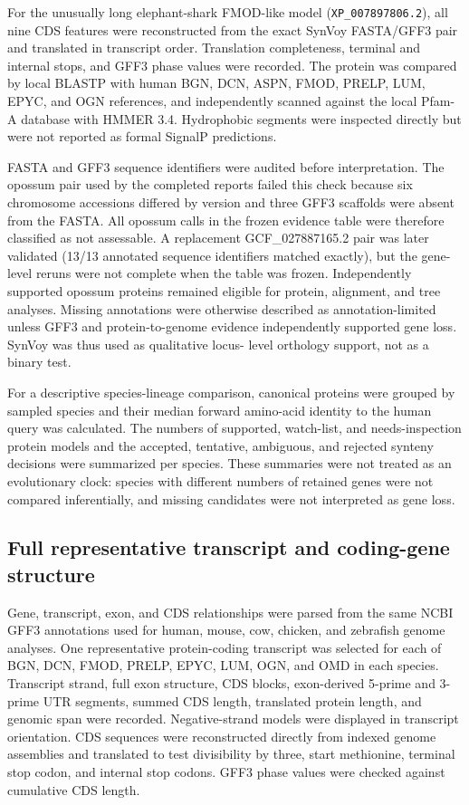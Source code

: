 For the unusually long elephant-shark FMOD-like model
(\texttt{XP\_007897806.2}), all nine CDS features were reconstructed from the
exact SynVoy FASTA/GFF3 pair and translated in transcript order. Translation
completeness, terminal and internal stops, and GFF3 phase values were recorded.
The protein was compared by local BLASTP with human BGN, DCN, ASPN, FMOD,
PRELP, LUM, EPYC, and OGN references, and independently scanned against the
local Pfam-A database with HMMER 3.4. Hydrophobic segments were inspected
directly but were not reported as formal SignalP predictions.

FASTA and GFF3 sequence identifiers were audited before interpretation. The
opossum pair used by the completed reports failed this check because six
chromosome accessions differed by version and three GFF3 scaffolds were absent
from the FASTA. All opossum calls in the frozen evidence table were therefore
classified as not assessable. A replacement GCF\_027887165.2 pair was later
validated (13/13 annotated sequence identifiers matched exactly), but the
gene-level reruns were not complete when the table was frozen. Independently
supported opossum proteins remained eligible for protein, alignment, and tree
analyses. Missing annotations were otherwise
described as annotation-limited unless GFF3 and protein-to-genome evidence
independently supported gene loss. SynVoy was thus used as qualitative locus-
level orthology support, not as a binary test.

For a descriptive species-lineage comparison, canonical proteins were grouped
by sampled species and their median forward amino-acid identity to the human
query was calculated. The numbers of supported, watch-list, and
needs-inspection protein models and the accepted, tentative, ambiguous, and
rejected synteny
decisions were summarized per species. These summaries were not treated as an
evolutionary clock: species with different numbers of retained genes were not
compared inferentially, and missing candidates were not interpreted as gene
loss.

\subsection{Full representative transcript and coding-gene structure}
\label{subsec:gene-structure}

Gene, transcript, exon, and CDS relationships were parsed from the same NCBI
GFF3 annotations used for human, mouse, cow, chicken, and zebrafish genome
analyses. One representative protein-coding transcript was selected for each of
BGN, DCN, FMOD, PRELP, EPYC, LUM, OGN, and OMD in each species. Transcript strand,
full exon structure, CDS blocks, exon-derived 5-prime and 3-prime UTR segments,
summed CDS length, translated protein length, and genomic span were recorded.
Negative-strand models were displayed in transcript orientation. CDS sequences
were reconstructed directly from indexed genome assemblies and translated to
test divisibility by three, start methionine, terminal stop codon, and internal
stop codons. GFF3 phase values were checked against cumulative CDS length.

